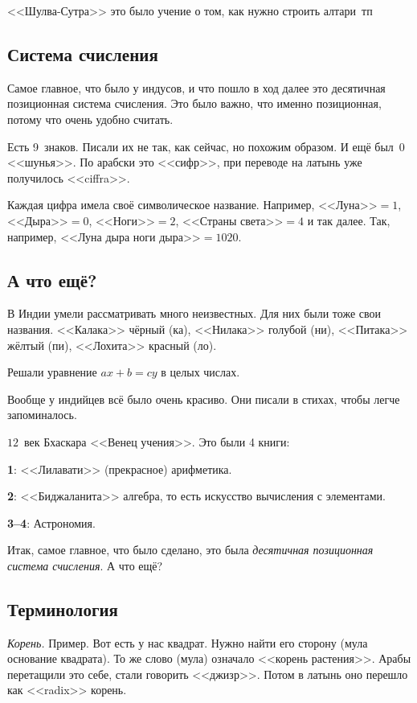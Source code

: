 \documentclass[a4paper,oneside,fleqn,10pt]{article}
\begin{document}
<<Шулва-Сутра>> это было учение о том, как нужно строить алтари~тп

\subsection{Система счисления}

Самое главное, что было у индусов, и что пошло в ход далее это десятичная позиционная система
счисления. Это было важно, что именно позиционная, потому что очень удобно считать.

Есть 9~знаков. Писали их не так, как сейчас, но похожим образом.
И ещё был~0 <<шунья>>. По арабски это <<сифр>>, при переводе на латынь
уже получилось <<ciffra>>.

Каждая цифра имела своё символическое название.
Например, <<Луна>>$=1$, <<Дыра>>$=0$, <<Ноги>>$=2$, <<Страны света>>$=4$ и так далее.
Так, например, <<Луна дыра ноги дыра>>$= 1020$.

\subsection{А что ещё?}

В Индии умели рассматривать много неизвестных.
Для них были тоже свои названия.
<<Калака>> чёрный (ка),
<<Нилака>> голубой (ни),
<<Питака>> жёлтый (пи),
<<Лохита>> красный (ло).

Решали уравнение $ax + b = cy$ в целых числах.

Вообще у индийцев всё было очень красиво. Они писали
в стихах, чтобы легче запоминалось.

$12$~век Бхаскара 
<<Венец учения>>. Это были 4 книги:

\textbf{1}: <<Лилавати>> (прекрасное) арифметика.

\textbf{2}: <<Биджаланита>> алгебра, то есть искусство вычисления с элементами.

\textbf{3--4}: Астрономия.

Итак, самое главное, что было сделано, это была \emph{десятичная позиционная система счисления}.
А что ещё?

\subsection{Терминология}

\emph{Корень.} Пример. Вот есть у нас квадрат. Нужно найти его сторону (мула основание квадрата).
То же слово (мула) означало <<корень растения>>. Арабы перетащили это себе,
стали говорить <<джизр>>. Потом в латынь оно перешло как <<radix>> корень.
\end{document}
